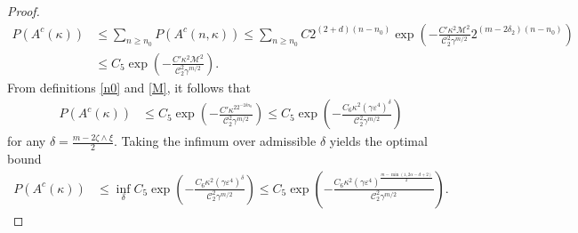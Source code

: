 \documentclass[12pt]{amsart}
\numberwithin{equation}{section}
\newcommand{\1}{\mathbf{1}}
\begin{document}
\begin{proof}
\begin{align*}
P\left(A^c(\kappa)\right)&\leq\sum_{n\geq n_0}P\left(A^c(n,\kappa)\right)\leq \sum_{n\geq n_0}C2^{(2+d)(n-n_0)}\exp\left(-\frac{C'\kappa^2\mathcal{M}^2}{\mathcal{C}_2^2\gamma^{m/2}}2^{(m-2\delta_2)(n-n_0)}\right)\\
&\leq C_5\exp\left(-\frac{C'\kappa^2\mathcal{M}^2}{\mathcal{C}_2^2\gamma^{m/2}}\right).
\end{align*}
From definitions \eqref{n0} and \eqref{M}, it follows that
\begin{align*}
P\left(A^c(\kappa)\right)&\leq C_5\exp\left(-\frac{C'\kappa^22^{-2\delta n_0}}{\mathcal{C}_2^2\gamma^{m/2}}\right)\leq C_5\exp\left(-\frac{C_6\kappa^2(\gamma\varepsilon^4)^\delta}{\mathcal{C}_2^2\gamma^{m/2}}\right)
\end{align*}
for any $\delta=\frac{m-2\zeta\wedge\xi}{2}$. Taking the infimum over admissible $\delta$ yields the optimal bound
\begin{align*}
P\left(A^c(\kappa)\right)&\leq \inf_{\delta}C_5\exp\left(-\frac{C_6\kappa^2(\gamma\varepsilon^4)^\delta}{\mathcal{C}_2^2\gamma^{m/2}}\right)\leq
C_5\exp\left(-\frac{C_6\kappa^2(\gamma\varepsilon^4)^{\frac{m-\min(1,2\alpha-d+2)}{2}}}{\mathcal{C}_2^2\gamma^{m/2}}\right).
\end{align*}


\end{proof}
\end{document}
